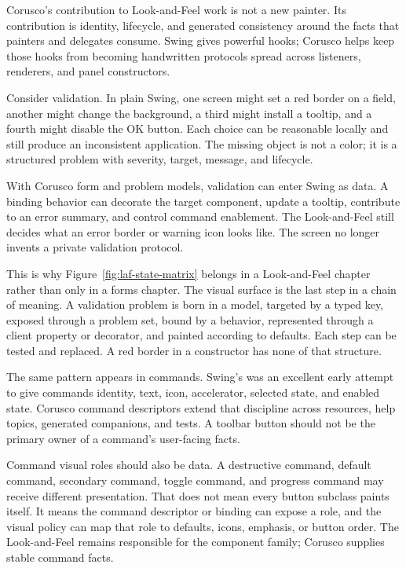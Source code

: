 Corusco's contribution to Look-and-Feel work is not a new painter. Its contribution is identity, lifecycle, and generated consistency around the facts that painters and delegates consume. Swing gives powerful hooks; Corusco helps keep those hooks from becoming handwritten protocols spread across listeners, renderers, and panel constructors.

Consider validation. In plain Swing, one screen might set a red border on a field, another might change the background, a third might install a tooltip, and a fourth might disable the OK button. Each choice can be reasonable locally and still produce an inconsistent application. The missing object is not a color; it is a structured problem with severity, target, message, and lifecycle.

With Corusco form and problem models, validation can enter Swing as data. A binding behavior can decorate the target component, update a tooltip, contribute to an error summary, and control command enablement. The Look-and-Feel still decides what an error border or warning icon looks like. The screen no longer invents a private validation protocol.

This is why Figure~\ref{fig:laf-state-matrix} belongs in a Look-and-Feel chapter rather than only in a forms chapter. The visual surface is the last step in a chain of meaning. A validation problem is born in a model, targeted by a typed key, exposed through a problem set, bound by a behavior, represented through a client property or decorator, and painted according to defaults. Each step can be tested and replaced. A red border in a constructor has none of that structure.

The same pattern appears in commands. Swing's  was an excellent early attempt to give commands identity, text, icon, accelerator, selected state, and enabled state. Corusco command descriptors extend that discipline across resources, help topics, generated companions, and tests. A toolbar button should not be the primary owner of a command's user-facing facts.

Command visual roles should also be data. A destructive command, default command, secondary command, toggle command, and progress command may receive different presentation. That does not mean every button subclass paints itself. It means the command descriptor or binding can expose a role, and the visual policy can map that role to defaults, icons, emphasis, or button order. The Look-and-Feel remains responsible for the component family; Corusco supplies stable command facts.

